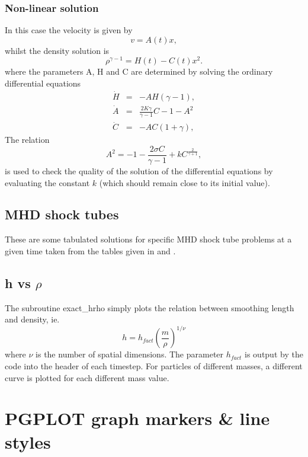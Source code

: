 \documentclass[a4paper,12pt]{article}
\begin{document}
\subsubsection{Non-linear solution}
In this case the velocity is given by
\begin{equation}
v = A(t) x,
\end{equation}
whilst the density solution is
\begin{equation}
\rho^{\gamma -1} = H(t) - C(t) x^2.
\end{equation}
where the parameters A, H and C are determined by solving the ordinary
differential equations
\begin{eqnarray}
\dot{H} & = & -AH(\gamma -1), \\
\dot{A} & = & \frac{2K \gamma}{\gamma -1} C - 1 - A^2 \\
\dot{C} & = & -AC(1+ \gamma),
\end{eqnarray}
The relation
\begin{equation}
A^2 = -1 - \frac{2 \sigma C}{\gamma -1} + kC^{\frac{2}{\gamma +1}},
\label{eq:kconst}
\end{equation}
is used to check the quality of the solution of the differential equations by
evaluating the constant $k$ (which should remain close to its initial value).

\subsection{MHD shock tubes}
 These are some tabulated solutions for specific MHD shock tube problems at a
given time taken from the tables given in \citet{dw94} and \citet{rj95}.

\subsection{h vs $\rho$}
 The subroutine exact\_hrho simply plots the relation between smoothing length
and density, ie.
\begin{equation}
h = h_{fact} \left(\frac{m}{\rho}\right)^{1/\nu}
\end{equation}
where $\nu$ is the number of spatial dimensions. The parameter $h_{fact}$ is
output by the code into the header of each timestep. For particles of different
masses, a different curve is plotted for each different mass value.

\newpage
\section{PGPLOT graph markers \& line styles}
\end{document}
